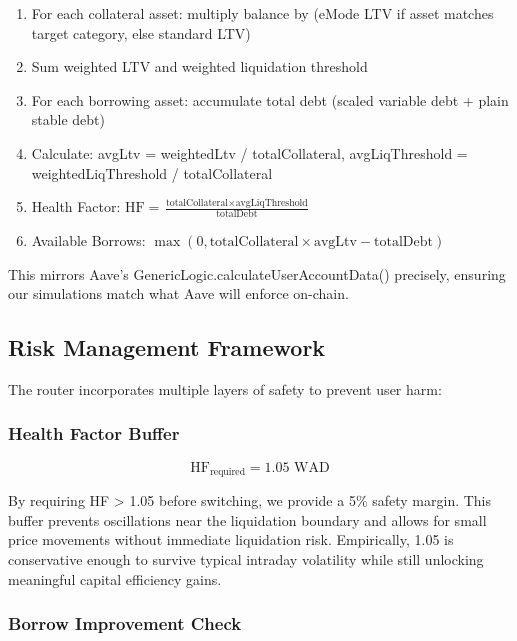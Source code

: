 \begin{enumerate}
    \item For each collateral asset: multiply balance by (eMode LTV if asset matches target category, else standard LTV)
    \item Sum weighted LTV and weighted liquidation threshold
    \item For each borrowing asset: accumulate total debt (scaled variable debt + plain stable debt)
    \item Calculate: avgLtv = weightedLtv / totalCollateral, avgLiqThreshold = weightedLiqThreshold / totalCollateral
    \item Health Factor: $\text{HF} = \frac{\text{totalCollateral} \times \text{avgLiqThreshold}}{\text{totalDebt}}$
    \item Available Borrows: $\max(0, \text{totalCollateral} \times \text{avgLtv} - \text{totalDebt})$
\end{enumerate}

This mirrors Aave's GenericLogic.calculateUserAccountData() precisely, ensuring our simulations match what Aave will enforce on-chain.

\subsection{Risk Management Framework}\label{sec:risk-management}

The router incorporates multiple layers of safety to prevent user harm:

\subsubsection{Health Factor Buffer}

\begin{equation}\label{eq:hf-buffer}
\text{HF}_{\text{required}} = 1.05 \text{ WAD}
\end{equation}

By requiring HF > 1.05 before switching, we provide a 5\% safety margin. This buffer prevents oscillations near the liquidation boundary and allows for small price movements without immediate liquidation risk. Empirically, 1.05 is conservative enough to survive typical intraday volatility while still unlocking meaningful capital efficiency gains.

\subsubsection{Borrow Improvement Check}

